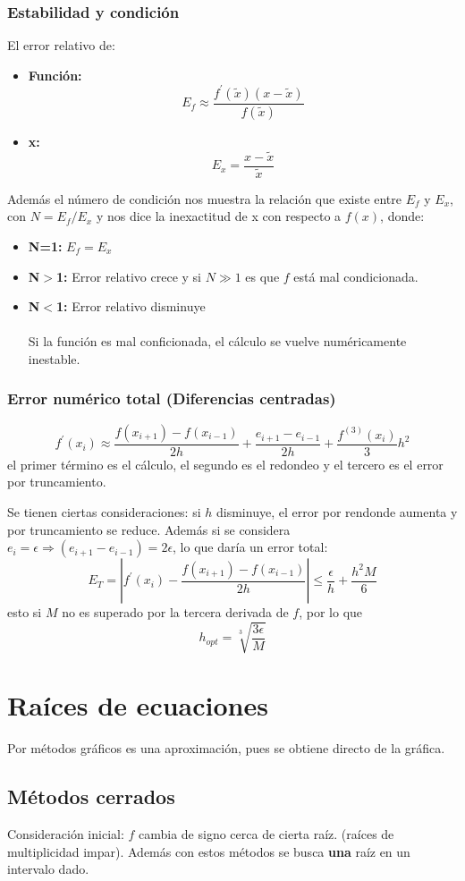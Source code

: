 \documentclass[letterpaper, 12pt, twoside]{article}
\begin{document}
	\subsubsection{Estabilidad y condición}
	El error relativo de:
	\begin{itemize}
		\item \textbf{Función:} $$E_f \approx \frac{f^{\prime}(\tilde{x})(x-\tilde{x})}{f(\tilde{x})}$$
		\item \textbf{x:} $$E_x = \frac{x-\tilde{x}}{\tilde{x}}$$
	\end{itemize}
	Además el número de condición nos muestra la relación que existe entre $E_f$ y $E_x$, con $N = E_f/E_x$ y nos dice la inexactitud de x con respecto a $f(x)$, donde:
	\begin{itemize}
		\item \textbf{N=1:} $E_f = E_x$
		\item \textbf{N$>$1:} Error relativo crece y si $N\gg1$ es que $f$ está mal condicionada.
		\item \textbf{N$<$1:} Error relativo disminuye\\\\
		Si la función es mal conficionada, el cálculo se vuelve numéricamente inestable.
	\end{itemize}
	\subsubsection{Error numérico total (Diferencias centradas)}
	$$ f^{\prime}(x_i)\approx\frac{f(x_{i+1})-f(x_{i-1})}{2h} + \frac{e_{i+1}-e_{i-1}}{2h} + \frac{f^{(3)}(x_i)}{3}h^2 $$ el primer término es el cálculo, el segundo es el redondeo y el tercero es el error por truncamiento.
	\bigskip
	
	Se tienen ciertas consideraciones: si $h$ disminuye, el error por rendonde aumenta y por truncamiento se reduce. Además si se considera $e_i = \epsilon \Rightarrow (e_{i+1}-e_{i-1})=2\epsilon$, lo que daría un error total: $$ E_T = \left|f^{\prime}(x_i)-\frac{f(x_{i+1})-f(x_{i-1})}{2h}\right| \leq \frac{\epsilon}{h} + \frac{h^2M}{6}$$ esto si $M$ no es superado por la tercera derivada de $f$, por lo que $$ h_{opt} = \sqrt[3]{\frac{3\epsilon}{M}} $$
	\section{Raíces de ecuaciones}
	Por métodos gráficos es una aproximación, pues se obtiene directo de la gráfica.
	\subsection{Métodos cerrados}
	Consideración inicial: $f$ cambia de signo cerca de cierta raíz. (raíces de multiplicidad impar). Además con estos métodos se busca \textbf{una} raíz en un intervalo dado.
\end{document}
